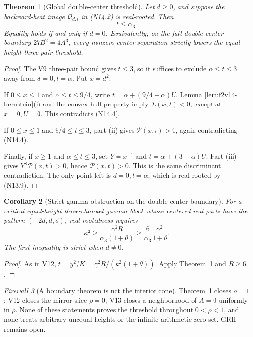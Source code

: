 \documentclass[11pt]{article}
\newtheorem{theorem}{Theorem}[section]
\newtheorem{corollary}[theorem]{Corollary}
\theoremstyle{definition}
\theoremstyle{remark}
\newtheorem{firewall}[theorem]{Firewall}
\begin{document}
\begin{theorem}[Global double-center threshold]
\label{thm:f2v14-double-center}
Let \(d\geq0\), and suppose the backward-heat image
\(\mathcal Q_{d,t}\) in \textup{(N14.2)} is real-rooted.  Then
\[
 t\leq\alpha_3.
 \tag{N14.17}
\]
Equality holds if and only if \(d=0\).  Equivalently, on the full
double-center boundary \(27B^2=4A^3\), every nonzero center separation
strictly lowers the equal-height three-pair threshold.
\end{theorem}

\begin{proof}
The V9 three-pair bound gives \(t\leq3\), so it suffices to exclude
\(\alpha\leq t\leq3\) away from \(d=0,t=\alpha\).  Put \(x=d^2\).

If \(0\leq x\leq1\) and
\(\alpha\leq t\leq9/4\), write
\(t=\alpha+(9/4-\alpha)U\).  Lemma
\ref{lem:f2v14-bernstein}\textup{(i)} and the convex-hull property imply
\(\Sigma(x,t)<0\), except at \(x=0,U=0\).  This contradicts
\textup{(N14.4)}.

If \(0\leq x\leq1\) and \(9/4\leq t\leq3\), part \textup{(ii)} gives
\(\mathcal P(x,t)>0\), again contradicting \textup{(N14.4)}.

Finally, if \(x\geq1\) and \(\alpha\leq t\leq3\), set \(Y=x^{-1}\) and
\(t=\alpha+(3-\alpha)U\).  Part \textup{(iii)} gives
\(Y^8\mathcal P(x,t)>0\), hence \(\mathcal P(x,t)>0\).  This is the same
discriminant contradiction.  The only point left is \(d=0,t=\alpha\),
which is real-rooted by \textup{(N13.9)}.
\end{proof}

\begin{corollary}[Strict gamma obstruction on the double-center boundary]
\label{cor:f2v14-gamma}
For a critical equal-height three-channel gamma block whose centered real
parts have the pattern \((-2d,d,d)\), real-rootedness requires
\[
 \kappa^2\geq
 \frac{\gamma^2R}{\alpha_3(1+\theta)}
 \geq\frac6{\alpha_3}\frac{\gamma^2}{1+\theta}.
 \tag{N14.18}
\]
The first inequality is strict when \(d\neq0\).
\end{corollary}

\begin{proof}
As in V12,
\(t=y^2/K=\gamma^2R/(\kappa^2(1+\theta))\).  Apply
Theorem~\ref{thm:f2v14-double-center} and \(R\geq6\).
\end{proof}

\begin{firewall}[A boundary theorem is not the interior cone]
Theorem~\ref{thm:f2v14-double-center} closes \(\rho=1\); V12 closes the
mirror slice \(\rho=0\); V13 closes a neighborhood of \(A=0\) uniformly
in \(\rho\).  None of these statements proves the threshold throughout
\(0<\rho<1\), and none treats arbitrary unequal heights or the infinite
arithmetic zero set.  GRH remains open.
\end{firewall}
\end{document}
